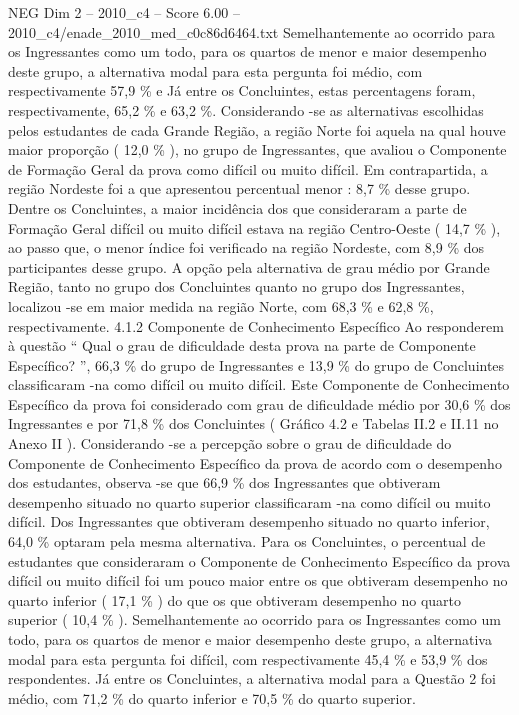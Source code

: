 \begin{textsample}{NEG Dim 2 – 2010\_c4 – Score 6.00 – 2010\_c4/enade\_2010\_med\_c0c86d6464.txt}
Semelhantemente ao ocorrido para os Ingressantes como um todo, para os quartos de menor e maior desempenho deste grupo, a alternativa modal para esta pergunta foi médio, com respectivamente 57,9 \% e Já entre os Concluintes, estas percentagens foram, respectivamente, 65,2 \% e 63,2 \%.
Considerando -se as alternativas escolhidas pelos estudantes de cada Grande Região, a região Norte foi aquela na qual houve maior proporção ( 12,0 \% ), no grupo de Ingressantes, que avaliou o Componente de Formação Geral da prova como difícil ou muito difícil.
Em contrapartida, a região Nordeste foi a que apresentou percentual menor : 8,7 \% desse grupo.
Dentre os Concluintes, a maior incidência dos que consideraram a parte de Formação Geral difícil ou muito difícil estava na região Centro-Oeste ( 14,7 \% ), ao passo que, o menor índice foi verificado na região Nordeste, com 8,9 \% dos participantes desse grupo.
A opção pela alternativa de grau médio por Grande Região, tanto no grupo dos Concluintes quanto no grupo dos Ingressantes, localizou -se em maior medida na região Norte, com 68,3 \% e 62,8 \%, respectivamente. 4.1.2 Componente de Conhecimento Específico Ao responderem à questão “ Qual o grau de dificuldade desta prova na parte de Componente Específico? ”, 66,3 \% do grupo de Ingressantes e 13,9 \% do grupo de Concluintes classificaram -na como difícil ou muito difícil.
Este Componente de Conhecimento Específico da prova foi considerado com grau de dificuldade médio por 30,6 \% dos Ingressantes e por 71,8 \% dos Concluintes ( Gráfico 4.2 e Tabelas II.2 e II.11 no Anexo II ).
Considerando -se a percepção sobre o grau de dificuldade do Componente de Conhecimento Específico da prova de acordo com o desempenho dos estudantes, observa -se que 66,9 \% dos Ingressantes que obtiveram desempenho situado no quarto superior classificaram -na como difícil ou muito difícil.
Dos Ingressantes que obtiveram desempenho situado no quarto inferior, 64,0 \% optaram pela mesma alternativa.
Para os Concluintes, o percentual de estudantes que consideraram o Componente de Conhecimento Específico da prova difícil ou muito difícil foi um pouco maior entre os que obtiveram desempenho no quarto inferior ( 17,1 \% ) do que os que obtiveram desempenho no quarto superior ( 10,4 \% ).
Semelhantemente ao ocorrido para os Ingressantes como um todo, para os quartos de menor e maior desempenho deste grupo, a alternativa modal para esta pergunta foi difícil, com respectivamente 45,4 \% e 53,9 \% dos respondentes.
Já entre os Concluintes, a alternativa modal para a Questão 2 foi médio, com 71,2 \% do quarto inferior e 70,5 \% do quarto superior.

\end{textsample}
